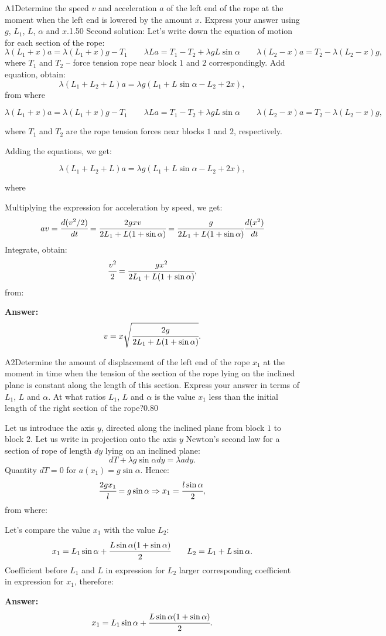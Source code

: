 \documentclass[11pt,a4paper]{article}
\begin{document}
\begin{solcard}{A1}{Determine the speed $v$ and acceleration $a$ of the left end of the rope at the moment when the left end is lowered by the amount $x$. Express your answer using $g$, $L_1$, $L$, $\alpha$ and $x$.}{1.50}
Second solution: Let's write down the equation of motion for each section of the rope: $$\lambda(L_1+x)a=\lambda(L_1+x)g-T_1\qquad \lambda La=T_1-T_2+\lambda gL\sin\alpha\qquad \lambda (L_2-x)a=T_2-\lambda (L_2-x)g{,} $$ where $T_1$ and $T_2$ – force tension rope near block $1$ and $2$ correspondingly. Add equation, obtain: $$\lambda(L_1+L_2+L)a=\lambda g(L_1+L\sin\alpha-L_2+2x){,} $$ from where


$$\lambda(L_1+x)a=\lambda(L_1+x)g-T_1\qquad \lambda La=T_1-T_2+\lambda gL\sin\alpha\qquad \lambda (L_2-x)a=T_2-\lambda (L_2-x)g{,} $$


where $T_1$ and $T_2$ are the rope tension forces near blocks $1$ and $2$, respectively.


Adding the equations, we get:


$$\lambda(L_1+L_2+L)a=\lambda g(L_1+L\sin\alpha-L_2+2x){,} $$


where


Multiplying the expression for acceleration by speed, we get: $$av=\cfrac{d(v^2/2)}{dt}=\cfrac{2gxv}{2L_1+L(1+\sin\alpha)}=\cfrac{g}{2L_1+L(1+\sin\alpha)}\cfrac{d(x^2)}{dt} $$Integrate, obtain: $$\cfrac{v^2}{2}=\cfrac{gx^2}{2L_1+L(1+\sin\alpha)}{,} $$from:

\par\smallskip\noindent\textbf{Answer:} $$v=x\sqrt{\cfrac{2g}{2L_1+L(1+\sin\alpha)}}{.} $$
\end{solcard}

\begin{solcard}{A2}{Determine the amount of displacement of the left end of the rope $x_1$ at the moment in time when the tension of the section of the rope lying on the inclined plane is constant along the length of this section. Express your answer in terms of $L_1$, $L$ and $\alpha$.  At what ratios $L_1$, $L$ and $\alpha$ is the value $x_1$ less than the initial length of the right section of the rope?}{0.80}

Let us introduce the axis $y$, directed along the inclined plane from block $1$ to block $2$. Let us write in projection onto the axis $y$ Newton’s second law for a section of rope of length $dy$ lying on an inclined plane: $$dT+\lambda g\sin\alpha dy=\lambda ady{.} $$Quantity $dT=0$ for $a(x_1)=g\sin\alpha$. Hence: $$\cfrac{2gx_1}{l}=g\sin\alpha\Rightarrow x_1=\cfrac{l\sin\alpha}{2}{,} $$from where:


Let's compare the value $x_1$ with the value $L_2$: $$x_1=L_1\sin\alpha+\cfrac{L\sin\alpha(1+\sin\alpha)}{2}\qquad L_2=L_1+L\sin\alpha{.} $$Coefficient before $L_1$ and $L$ in expression for $L_2$ larger corresponding coefficient in expression for $x_1$, therefore:

\par\smallskip\noindent\textbf{Answer:} $$x_1=L_1\sin\alpha+\cfrac{L\sin\alpha(1+\sin\alpha)}{2}{.} $$
\end{solcard}
\end{document}
